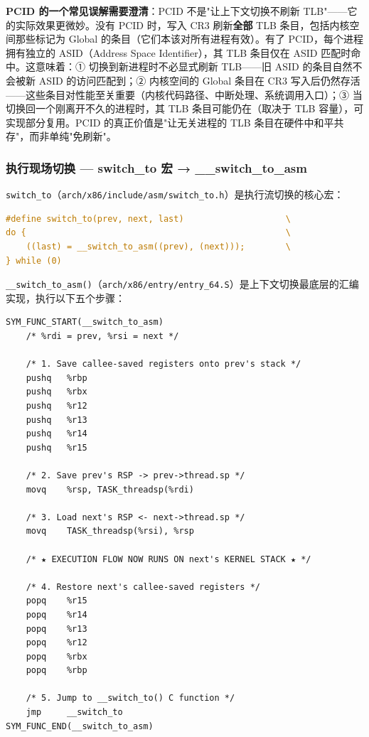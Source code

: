 \documentclass[a4paper]{article}
\begin{document}
\textbf{PCID 的一个常见误解需要澄清}：PCID 不是"让上下文切换不刷新 TLB"——它的实际效果更微妙。没有 PCID 时，写入 CR3 刷新\textbf{全部} TLB 条目，包括内核空间那些标记为 Global 的条目（它们本该对所有进程有效）。有了 PCID，每个进程拥有独立的 ASID（Address Space Identifier），其 TLB 条目仅在 ASID 匹配时命中。这意味着：① 切换到新进程时不必显式刷新 TLB——旧 ASID 的条目自然不会被新 ASID 的访问匹配到；② 内核空间的 Global 条目在 CR3 写入后仍然存活——这些条目对性能至关重要（内核代码路径、中断处理、系统调用入口）；③ 当切换回一个刚离开不久的进程时，其 TLB 条目可能仍在（取决于 TLB 容量），可实现部分复用。PCID 的真正价值是"让无关进程的 TLB 条目在硬件中和平共存"，而非单纯"免刷新"\cite{intel_sdm}。

\subsubsection{执行现场切换 — switch\_to 宏 → \_\_switch\_to\_asm}

\texttt{switch\_to}（\texttt{arch/x86/include/asm/switch\_to.h}）是执行流切换的核心宏：

\begin{lstlisting}[language=C, caption={switch\_to 宏定义（arch/x86/include/asm/switch\_to.h）}, label={lst:switch_to}]
#define switch_to(prev, next, last)                    \
do {                                                   \
    ((last) = __switch_to_asm((prev), (next)));        \
} while (0)
\end{lstlisting}

\texttt{\_\_switch\_to\_asm()}（\texttt{arch/x86/entry/entry\_64.S}）是上下文切换最底层的汇编实现，执行以下五个步骤\cite{x86_abi}：

\begin{lstlisting}[caption={\_\_switch\_to\_asm 汇编实现（arch/x86/entry/entry\_64.S）}, label={lst:switch_asm}]
SYM_FUNC_START(__switch_to_asm)
    /* %rdi = prev, %rsi = next */

    /* 1. Save callee-saved registers onto prev's stack */
    pushq   %rbp
    pushq   %rbx
    pushq   %r12
    pushq   %r13
    pushq   %r14
    pushq   %r15

    /* 2. Save prev's RSP -> prev->thread.sp */
    movq    %rsp, TASK_threadsp(%rdi)

    /* 3. Load next's RSP <- next->thread.sp */
    movq    TASK_threadsp(%rsi), %rsp

    /* ★ EXECUTION FLOW NOW RUNS ON next's KERNEL STACK ★ */

    /* 4. Restore next's callee-saved registers */
    popq    %r15
    popq    %r14
    popq    %r13
    popq    %r12
    popq    %rbx
    popq    %rbp

    /* 5. Jump to __switch_to() C function */
    jmp     __switch_to
SYM_FUNC_END(__switch_to_asm)
\end{lstlisting}
\end{document}

